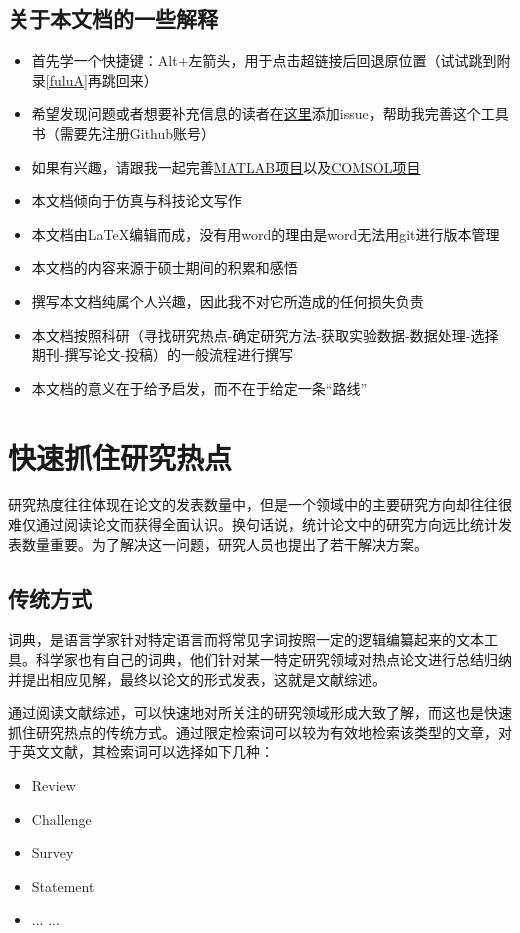 \documentclass[UTF8,oneside]{ctexbook}
\begin{document}
\section{关于本文档的一些解释}
\begin{itemize}
	\item 首先学一个快捷键：Alt+左箭头，用于点击超链接后回退原位置（试试跳到附录\ref{fuluA}再跳回来）
	\item 希望发现问题或者想要补充信息的读者在\href{https://github.com/lonelybag/Latex_lonelybag/issues}{这里}添加issue，帮助我完善这个工具书（需要先注册Github账号）
	\item 如果有兴趣，请跟我一起完善\href{https://github.com/lonelybag/MATLAB_DEMO}{MATLAB项目}以及\href{https://github.com/lonelybag/Comsol_lonelybag}{COMSOL项目}
	\item 本文档倾向于仿真与科技论文写作
	\item 本文档由\LaTeX 编辑而成，没有用word的理由是word无法用git进行版本管理
	\item 本文档的内容来源于硕士期间的积累和感悟
	\item 撰写本文档纯属个人兴趣，因此我不对它所造成的任何损失负责
	\item 本文档按照科研（寻找研究热点-确定研究方法-获取实验数据-数据处理-选择期刊-撰写论文-投稿）的一般流程进行撰写
	\item 本文档的意义在于给予启发，而不在于给定一条“路线”
\end{itemize}

\chapter{快速抓住研究热点}
研究热度往往体现在论文的发表数量中，但是一个领域中的主要研究方向却往往很难仅通过阅读论文而获得全面认识。换句话说，统计论文中的研究方向远比统计发表数量重要。为了解决这一问题，研究人员也提出了若干解决方案。

\section{传统方式}
词典，是语言学家针对特定语言而将常见字词按照一定的逻辑编纂起来的文本工具。科学家也有自己的词典，他们针对某一特定研究领域对热点论文进行总结归纳并提出相应见解，最终以论文的形式发表，这就是文献综述。

通过阅读文献综述，可以快速地对所关注的研究领域形成大致了解，而这也是快速抓住研究热点的传统方式。通过限定检索词可以较为有效地检索该类型的文章，对于英文文献，其检索词可以选择如下几种：
\begin{itemize}
	\item Review
	\item Challenge
	\item Survey
	\item Statement
	\item ... ...
\end{itemize}
\end{document}
